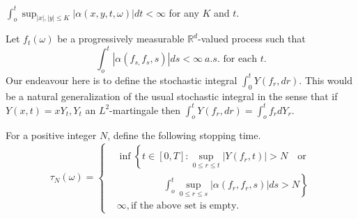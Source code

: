 \begin{Assumption}\label{c2:asm4} %
   $   \int^t_{o}\sup_{|x|,|y| \leq K}| \alpha(x,y,t,\omega)|dt <
  \infty$ for any $K$ and $t$. 
 
   Let $f_t(\omega)$ be a progressively measurable
   $\mathbb{R}^d$-valued process such that  
   \begin{equation*}
     \int^t_{o}|\alpha(f_{s,}f_s,s)|ds < \infty   ~a.s. \text{ for
       each }t. \tag{2.3.1}\label{c2:eq2.3.1} 
   \end{equation*} 
 Our endeavour here is to define the stochastic integral $\int^t_{0}
 Y(f_r, dr)$. This would be a natural generalization of the usual
 stochastic integral in the sense that if $Y(x, t)=xY_t,Y_t$ an
 $L^2$-martingale then $\int ^t_{o}Y(f_r,dr)=\int^t_{o}f_r dY_r$. 
\end{Assumption}


\medskip
{}

 For a positive integer $N$, define the following stopping time.
 \begin{equation*}
    \tau_N(\omega)=
    \begin{cases}
&     \inf \left\{t \in [0,T]:\sup\limits_{0 \leq r \leq t}|
     Y(f_r,t)|> N \quad \text{or} \right.\\
& \hspace{2cm} \left.\int ^t_{o} \sup \limits_{0 \leq r \leq
       s}| \alpha(f_r,f_r,s)|ds >N\right\}\\ 
 &    \infty, \text{if the above set is empty.}
   \end{cases}
 \end{equation*}
 
